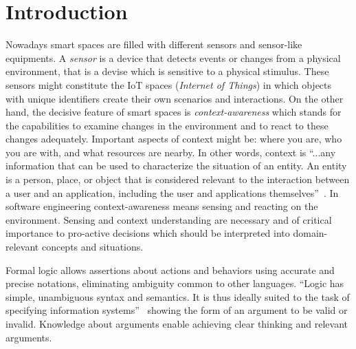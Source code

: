 \documentclass[runningheads,a4paper]{llncs}
\begin{document}
\section{Introduction}
\label{sec:introduction}


Nowadays smart spaces are filled with different sensors and sensor-like equipments.
A \emph{sensor} is a device that detects events or changes from a physical environment,
that is a devise which is sensitive to a physical stimulus.
These sensors might constitute the IoT spaces (\emph{Internet of Things})
in which objects with unique identifiers create their own scenarios and interactions.
On the other hand,
the decisive feature of smart spaces is \emph{context-awareness}
which stands for the capabilities to examine changes in
the environment and to react to these changes adequately.
Important aspects of context might be:
where you are, who you are with,
and what resources are nearby.
In other words, context is ``...any information that can be used to characterize the situation of an entity.
An entity is a person, place, or object that is considered relevant to the interaction between
a user and an application, including the user and applications themselves''~\cite{Dey-Abowd-2000}.
In software engineering context-awareness means sensing and reacting on the environment.
Sensing and context understanding are necessary and of critical importance to pro-active decisions which
should be interpreted into domain-relevant concepts and situations.

Formal logic allows assertions about actions and behaviors using accurate and precise notations,
eliminating ambiguity common to other languages.
``Logic has simple, unambiguous syntax and semantics.
It is thus ideally suited to the task of specifying information systems''~\cite{Chomicki-Saake-1998}
showing the form of an argument to be valid or invalid.
Knowledge about arguments enable achieving clear thinking and relevant arguments.
\end{document}
